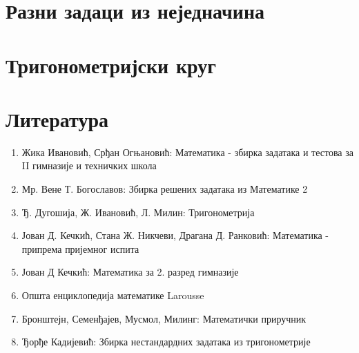 \documentclass[a4paper,12pt]{article}
\begin{document}
\newpage
\section{Разни задаци из неједначина}




\newpage
\section{Тригонометријски круг}



\newpage
\section{Литература}

\begin{enumerate}
\item Жика Ивановић, Срђан Огњановић: Математика - збирка задатака и тестова за II гимназије и техничких школа
\item Мр. Вене Т. Богославов: Збирка решених задатака из Математике 2
\item Ђ. Дугошија, Ж. Ивановић, Л. Милин: Тригонометрија
\item Јован Д. Кечкић, Стана Ж. Никчеви, Драгана Д. Ранковић: Математика - припрема пријемног испита
\item Јован Д Кечкић: Математика за 2. разред гимназије
\item Општа енциклопедија математике Larousse
\item Бронштејн, Семенђајев, Мусмол, Милинг: Математички приручник
\item Ђорђе Кадијевић: Збирка нестандардних задатака из тригонометрије
\end{enumerate}
\end{document}
